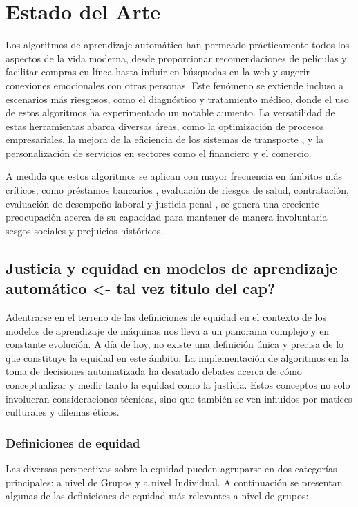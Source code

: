 \chapter{Estado del Arte}\label{chapter:state-of-the-art}

Los algoritmos de aprendizaje autom\'atico han permeado pr\'acticamente todos los aspectos de la vida moderna,
desde proporcionar recomendaciones de pel\'iculas y facilitar compras en l\'inea hasta influir en b\'usquedas en la web
y sugerir conexiones emocionales con otras personas. Este fen\'omeno se extiende incluso a escenarios m\'as riesgosos,
como el diagn\'ostico y tratamiento m\'edico, donde el uso de estos algoritmos ha experimentado un notable aumento.
La versatilidad de estas herramientas abarca diversas \'areas, como la optimizaci\'on de procesos empresariales, la 
mejora de la eficiencia de los sistemas de transporte \cite{autonomous_driving}, y la personalizaci\'on de servicios en 
sectores como el financiero y el comercio.

A medida que estos algoritmos se aplican con mayor frecuencia en \'ambitos m\'as cr\'iticos, como
pr\'estamos bancarios \cite{fairness_def}, evaluaci\'on de riesgos de salud, contrataci\'on, evaluaci\'on de desempe\~no laboral y
justicia penal \cite{compas}, se genera una creciente preocupaci\'on acerca de su capacidad para mantener de manera involuntaria 
sesgos sociales y prejuicios hist\'oricos. 

\section{Justicia y equidad en modelos de aprendizaje autom\'atico <- tal vez titulo del cap?}

Adentrarse en el terreno de las definiciones de equidad en el contexto de los modelos de aprendizaje de m\'aquinas nos lleva 
a un panorama complejo y en constante evoluci\'on. A d\'ia de hoy, no existe una definici\'on \'unica y precisa
de lo que constituye la equidad en este \'ambito. La implementaci\'on de algoritmos en la toma de decisiones automatizada ha desatado 
debates acerca de c\'omo conceptualizar y medir tanto la equidad como la justicia. Estos conceptos no solo involucran consideraciones 
t\'ecnicas, sino que tambi\'en se ven influidos por matices culturales y dilemas \'eticos.

\subsection{Definiciones de equidad}
Las diversas perspectivas sobre la equidad pueden agruparse en dos categor\'ias principales: a nivel de Grupos y a nivel Individual. 
A continuaci\'on se presentan algunas de las definiciones de equidad m\'as relevantes a nivel de grupos:

